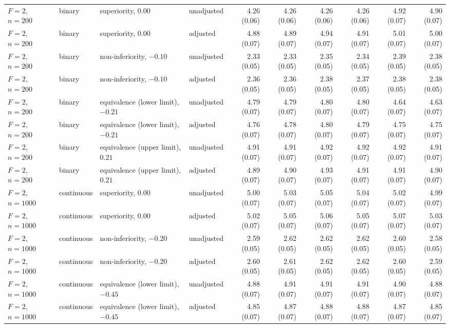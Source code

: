 \documentclass[12pt,a4paper]{article}
\theoremstyle{definition}
\theoremstyle{remark}\newtheorem{remark}{Remark}
\numberwithin{equation}{section}
\begin{document}
\begin{landscape}
\begin{singlespace}
\begin{longtable}{@{}llllrrrrrr@{}}
$F=2$, $n=200$ & binary & superiority, $0.00$ & unadjusted & 4.26 (0.06) & 4.26 (0.06) & 4.26 (0.06) & 4.26 (0.06) & 4.92 (0.07) & 4.90 (0.07)\\
$F=2$, $n=200$ & binary & superiority, $0.00$ & adjusted & 4.88 (0.07) & 4.89 (0.07) & 4.94 (0.07) & 4.91 (0.07) & 5.01 (0.07) & 5.00 (0.07)\\
$F=2$, $n=200$ & binary & non-inferiority, $-0.10$ & unadjusted & 2.33 (0.05) & 2.33 (0.05) & 2.35 (0.05) & 2.34 (0.05) & 2.39 (0.05) & 2.38 (0.05)\\
$F=2$, $n=200$ & binary & non-inferiority, $-0.10$ & adjusted & 2.36 (0.05) & 2.36 (0.05) & 2.38 (0.05) & 2.37 (0.05) & 2.38 (0.05) & 2.38 (0.05)\\
$F=2$, $n=200$ & binary & equivalence (lower limit), $-0.21$ & unadjusted & 4.79 (0.07) & 4.79 (0.07) & 4.80 (0.07) & 4.80 (0.07) & 4.64 (0.07) & 4.63 (0.07)\\
$F=2$, $n=200$ & binary & equivalence (lower limit), $-0.21$ & adjusted & 4.76 (0.07) & 4.78 (0.07) & 4.80 (0.07) & 4.79 (0.07) & 4.75 (0.07) & 4.75 (0.07)\\
$F=2$, $n=200$ & binary & equivalence (upper limit), $0.21$ & unadjusted & 4.91 (0.07) & 4.91 (0.07) & 4.92 (0.07) & 4.92 (0.07) & 4.92 (0.07) & 4.91 (0.07)\\
$F=2$, $n=200$ & binary & equivalence (upper limit), $0.21$ & adjusted & 4.89 (0.07) & 4.90 (0.07) & 4.93 (0.07) & 4.91 (0.07) & 4.91 (0.07) & 4.90 (0.07)\\
$F=2$, $n=1000$ & continuous & superiority, $0.00$ & unadjusted & 5.00 (0.07) & 5.03 (0.07) & 5.05 (0.07) & 5.04 (0.07) & 5.02 (0.07) & 4.99 (0.07)\\
$F=2$, $n=1000$ & continuous & superiority, $0.00$ & adjusted & 5.02 (0.07) & 5.05 (0.07) & 5.06 (0.07) & 5.05 (0.07) & 5.07 (0.07) & 5.03 (0.07)\\
$F=2$, $n=1000$ & continuous & non-inferiority, $-0.20$ & unadjusted & 2.59 (0.05) & 2.62 (0.05) & 2.62 (0.05) & 2.62 (0.05) & 2.60 (0.05) & 2.58 (0.05)\\
$F=2$, $n=1000$ & continuous & non-inferiority, $-0.20$ & adjusted & 2.60 (0.05) & 2.61 (0.05) & 2.62 (0.05) & 2.62 (0.05) & 2.60 (0.05) & 2.59 (0.05)\\
$F=2$, $n=1000$ & continuous & equivalence (lower limit), $-0.45$ & unadjusted & 4.88 (0.07) & 4.91 (0.07) & 4.91 (0.07) & 4.91 (0.07) & 4.90 (0.07) & 4.88 (0.07)\\
$F=2$, $n=1000$ & continuous & equivalence (lower limit), $-0.45$ & adjusted & 4.85 (0.07) & 4.87 (0.07) & 4.88 (0.07) & 4.88 (0.07) & 4.87 (0.07) & 4.85 (0.07)\\

\end{longtable}
\end{singlespace}
\end{landscape}
\end{document}
